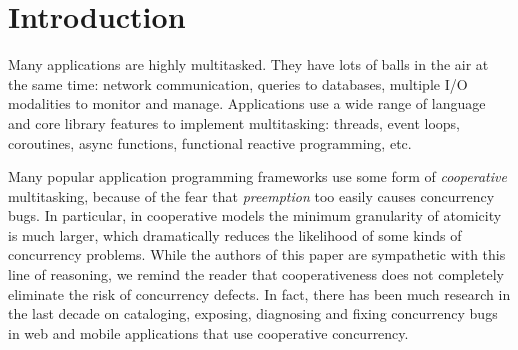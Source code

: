 \documentclass[acmsmall,anonymous,review]{acmart}\settopmatter{printfolios=true,printccs=false,printacmref=false}
\begin{document}

\maketitle




\section{Introduction}

Many applications are highly multitasked.
They have lots of balls in the air at the same time: network communication, queries to databases, multiple I/O modalities to monitor and manage.
Applications use a wide range of language and core library features to implement multitasking: threads, event loops, coroutines, async functions, functional reactive programming, etc.\footnotemark{}


Many popular application programming frameworks use some form of \emph{cooperative} multitasking, because of the fear that \emph{preemption} too easily causes concurrency bugs.
In particular, in cooperative models the minimum granularity of atomicity is much larger, which dramatically reduces the likelihood of some kinds of concurrency problems.
While the authors of this paper are sympathetic with this line of reasoning, we remind the reader that cooperativeness does not completely eliminate the risk of concurrency defects\footnotemark{}.
In fact, there has been much research in the last decade on cataloging, exposing, diagnosing and fixing concurrency bugs in web and mobile applications that use cooperative concurrency.
\end{document}
